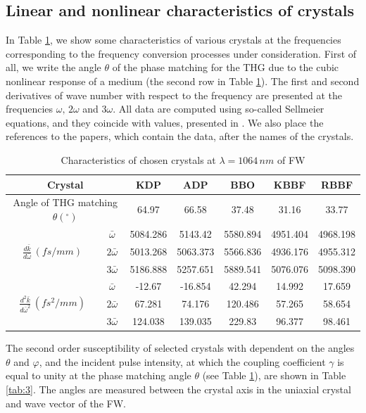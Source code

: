 \documentclass[a4paper, 12pt, onecolumn]{extarticle}
\begin{document}
\subsection*{Linear and nonlinear characteristics of crystals}
In Table \ref{tab:2}, we show some characteristics of various crystals at the frequencies corresponding to the frequency conversion processes under consideration. First of all, we write the angle \(\theta\) of the phase matching for the THG due to the cubic nonlinear response of a medium (the second row in Table \ref{tab:2}). The first and second derivatives of wave number with respect to the frequency are presented at the frequencies \(\omega,\, 2\omega\) and \(3\omega\). All data are computed using so-called Sellmeier equations, and they coincide with values, presented in \cite{bib:ri}. We also place the references to the papers, which contain the data, after the names of the crystals. 

\begin{table}
\caption{Characteristics of chosen crystals at \(\lambda=1064\,nm\) of FW}
{\begin{tabular}{|c|c|c|c|c|c|c|} 
\hline
\multicolumn{2}{|c|}{Crystal}& KDP \cite{bib:n26} & ADP \cite{bib:n26} & BBO \cite{bib:c1} & KBBF \cite{bib:c2} &RBBF \cite{bib:c3}\\
\hline
\multicolumn{2}{|c|}{Angle of THG matching $\theta (^{\circ})$} & 64.97 & 66.58 & 37.48 & 31.16 & 33.77 \\
\hline
\multirow{3}{*}{$\frac{d\bar{k}}{d\bar{\omega}}\,(fs/mm)$}& $\bar{\omega}$ & 5084.286 & 5143.42 & 5580.894 & 4951.404 & 4968.198 \\
\cline{2-7}
&$2\bar{\omega}$& 5013.268 & 5063.373 & 5566.836 & 4936.176 & 4955.312 \\
\cline{2-7}
&$3\bar{\omega}$& 5186.888 & 5257.651 & 5889.541 & 5076.076 & 5098.390\\
\hline
\multirow{3}{*}{$\frac{d^2\bar{k}}{d\bar{\omega}^2}\,(fs^2/mm)$}&$\bar{\omega}$ & -12.67 & -16.854 & 42.294 & 14.992 & 17.659 \\
\cline{2-7}
&$2\bar{\omega}$& 67.281 & 74.176 & 120.486 & 57.265 & 58.654 \\
\cline{2-7}
&$3\bar{\omega}$& 124.038 & 139.035 & 229.83 & 96.377 & 98.461 \\
\hline
\end{tabular}
\label{tab:2}}
\end{table}

The second order susceptibility of selected crystals with dependent on the angles \(\theta\) and \(\varphi\), and the incident pulse intensity, at which the coupling coefficient \(\gamma\) is equal to unity at the phase matching angle \(\theta\) (see Table \ref{tab:2}), are shown in Table \ref{tab:3}. The angles are measured between the crystal axis in the uniaxial crystal and wave vector of the FW.
\end{document}
